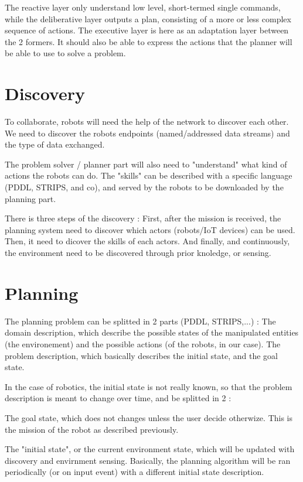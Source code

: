 \documentclass[conference]{IEEEtran}
\begin{document}
The reactive layer only understand low level, short-termed single commands, while the deliberative layer outputs a plan, consisting of a more or less complex sequence of actions.
The executive layer is here as an adaptation layer between the 2 formers.
It should also be able to express the actions that the planner will be able to use to solve a problem.

\section{Discovery}

To collaborate, robots will need the help of the network to discover each other.
We need to discover the robots endpoints (named/addressed data streams) and the type of data exchanged.

The problem solver / planner part will also need to "understand" what kind of actions the robots can do.
The "skills" can be described with a specific language (PDDL, STRIPS, and co), and served by the robots to be downloaded by the planning part.

There is three steps of the discovery : 
First, after the mission is received, the planning system need to discover which actors (robots/IoT devices) can be used.
Then, it need to dicover the skills of each actors.
And finally, and continuously, the environment need to be discovered through prior knoledge, or sensing.

\section{Planning}

The planning problem can be splitted in 2 parts (PDDL, STRIPS,...) : 
The domain description, which describe the possible states of the manipulated entities (the environement) and the possible actions (of the robots, in our case).
The problem description, which basically describes the initial state, and the goal state.

In the case of robotics, the initial state is not really known, so that the problem description is meant to change over time, and be splitted in 2 : 

The goal state, which does not changes unless the user decide otherwize.
This is the mission of the robot as described previously.

The "initial state", or the current environment state, which will be updated with discovery and envirnment sensing.
Basically, the planning algorithm will be ran periodically (or on input event) with a different initial state description.
\end{document}
